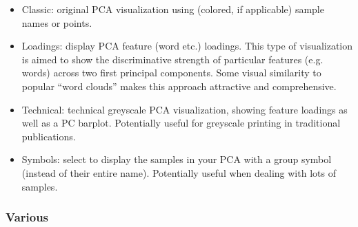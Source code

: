 \documentclass[11pt,a4paper]{article}
\def\margin#1{\marginpar{\textcolor{blue}{\footnotesize\tt #1}}}
\begin{document}
\begin{itemize}
\item Classic:\margin{"classic"} original PCA visualization using 
(colored, if applicable) sample names or points. 

\item Loadings:\margin{"loadings"} display
PCA feature (word etc.) loadings. This type of visualization is aimed
to show the discriminative strength of particular features (e.g. words)
across two first principal components. Some visual similarity to popular
``word clouds'' makes this approach attractive and comprehensive. 

\item Technical:\margin{"technical"} technical
greyscale PCA visualization, showing feature loadings as well as a
PC barplot. Potentially useful for greyscale printing in traditional
publications. 

\item Symbols:\margin{"symbols"} select to
display the samples in your PCA with a group symbol (instead of their
entire name). Potentially useful when dealing with lots of samples. 
\end{itemize}



\subsubsection{Various}
\end{document}
